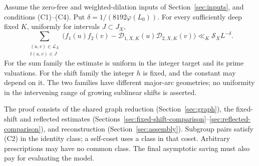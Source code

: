 \begin{theorem}\label{thm:model-comparison}
Assume the zero-free and weighted-dilation inputs of
Section~\ref{sec:inputs}, and conditions \textup{(C1)--(C4)}.
Put \(\delta=1/(8192\varphi(L_0))\). For every sufficiently deep
fixed \(K\), uniformly for intervals \(J\subset J_X\),
\begin{equation}\label{eq:model-comparison-conclusion}
 \sum_{\substack{(u,v)\in\mathcal L_X\\t(u,v)\in J}}
     \bigl(f_1(u)f_2(v)-\mathcal D_{1,X,K}(u)\mathcal D_{2,X,K}(v)\bigr)
                       \ll_K\mathcal S_XL^{-\delta}.
\end{equation}
For the sum family the estimate is uniform in the integer target
and its prime valuations. For the shift family the integer \(h\)
is fixed, and the constant may depend on it. The two families have
different major-arc geometries; no uniformity in the intervening
range of growing sublinear shifts is asserted.
\end{theorem}

The proof consists of the shared graph reduction
(Section~\ref{sec:graph}), the fixed-shift and reflected estimates
(Sections~\ref{sec:fixed-shift-comparison}--\ref{sec:reflected-comparison}),
and reconstruction (Section~\ref{sec:assembly}).
Subgroup pairs satisfy (C2) in the identity class; a self-coset uses a
class in that coset. Arbitrary prescriptions may have no common class.
The final asymptotic saving must also pay for evaluating the model.
